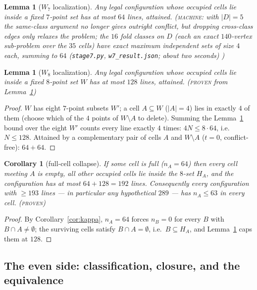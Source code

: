 \documentclass[11pt]{article}
\newtheorem{lemma}[theorem]{Lemma}
\newtheorem{corollary}[theorem]{Corollary}
\theoremstyle{remark}
\begin{document}
\begin{lemma}[$W_7$ localization]\label{lem:w7}
Any legal configuration whose occupied cells lie inside a fixed $7$-point
set has at most $64$ lines, attained. \textsc{(machine}: with
$|D|=5$ the same-class argument no longer gives outright conflict, but
dropping cross-class edges only relaxes the problem; the $16$ fold classes
on $D$ (each an exact $140$-vertex sub-problem over the $35$ cells) have
exact maximum independent sets of size $4$ each, summing to $64$
(\texttt{stage7.py}, \texttt{w7\_result.json}; about two seconds)%
\textsc{)}
\end{lemma}

\begin{lemma}[$W_8$ localization]\label{lem:w8}
Any legal configuration whose occupied cells lie inside a fixed $8$-point
set $W$ has at most $128$ lines, attained. \textsc{(proven} from
Lemma~\ref{lem:w7}\textsc{)}
\end{lemma}

\begin{proof}
$W$ has eight $7$-point subsets $W'$; a cell $A\subseteq W$ ($|A|=4$) lies
in exactly $4$ of them (choose which of the $4$ points of
$W\setminus A$ to delete). Summing the Lemma~\ref{lem:w7} bound over the
eight $W'$ counts every line exactly $4$ times: $4N\le 8\cdot 64$, i.e.\
$N\le128$. Attained by a complementary pair of cells $A$ and $W\setminus
A$ ($t=0$, conflict-free): $64+64$.
\end{proof}

\begin{corollary}[full-cell collapse]\label{cor:fullcell}
If some cell is full ($n_A=64$) then every cell meeting $A$ is empty, all
other occupied cells lie inside the $8$-set $H_A$, and the configuration
has at most $64+128=192$ lines. Consequently every configuration with
$\ge193$ lines --- in particular any hypothetical $289$ --- has
$n_A\le 63$ in every cell. \textsc{(proven)}
\end{corollary}

\begin{proof}
By Corollary~\ref{cor:kappa}, $n_A=64$ forces $n_B=0$ for every $B$ with
$B\cap A\ne\emptyset$; the surviving cells satisfy $B\cap A=\emptyset$,
i.e.\ $B\subseteq H_A$, and Lemma~\ref{lem:w8} caps them at $128$.
\end{proof}

\subsection{The even side: classification, closure, and the equivalence}
\end{document}
